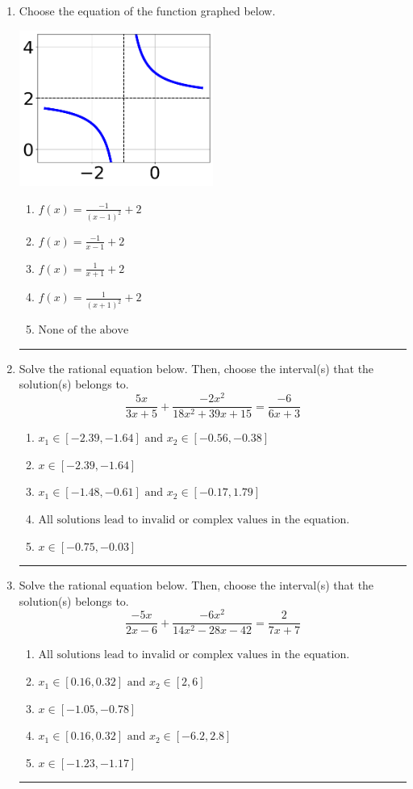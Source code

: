\documentclass[14pt]{extbook}
\newcommand{\litem}[1]{\item#1\hspace*{-1cm}\rule{\textwidth}{0.4pt}}
\begin{document}
\begin{enumerate}
{\begin{enumerate}[label=\Alph*.]
\end{enumerate} }
\litem{
Choose the equation of the function graphed below.
\begin{center}
    \includegraphics[width=0.5\textwidth]{../Figures/rationalGraphToEquationB.png}
\end{center}
\begin{enumerate}[label=\Alph*.]
\item \( f(x) = \frac{-1}{(x - 1)^2} + 2 \)
\item \( f(x) = \frac{-1}{x - 1} + 2 \)
\item \( f(x) = \frac{1}{x + 1} + 2 \)
\item \( f(x) = \frac{1}{(x + 1)^2} + 2 \)
\item \( \text{None of the above} \)

\end{enumerate} }
\litem{
Solve the rational equation below. Then, choose the interval(s) that the solution(s) belongs to.\[ \frac{5x}{3x + 5} + \frac{-2x^{2}}{18x^{2} +39 x + 15} = \frac{-6}{6x + 3} \]\begin{enumerate}[label=\Alph*.]
\item \( x_1 \in [-2.39, -1.64] \text{ and } x_2 \in [-0.56,-0.38] \)
\item \( x \in [-2.39,-1.64] \)
\item \( x_1 \in [-1.48, -0.61] \text{ and } x_2 \in [-0.17,1.79] \)
\item \( \text{All solutions lead to invalid or complex values in the equation.} \)
\item \( x \in [-0.75,-0.03] \)

\end{enumerate} }
\litem{
Solve the rational equation below. Then, choose the interval(s) that the solution(s) belongs to.\[ \frac{-5x}{2x -6} + \frac{-6x^{2}}{14x^{2} -28 x -42} = \frac{2}{7x + 7} \]\begin{enumerate}[label=\Alph*.]
\item \( \text{All solutions lead to invalid or complex values in the equation.} \)
\item \( x_1 \in [0.16, 0.32] \text{ and } x_2 \in [2,6] \)
\item \( x \in [-1.05,-0.78] \)
\item \( x_1 \in [0.16, 0.32] \text{ and } x_2 \in [-6.2,2.8] \)
\item \( x \in [-1.23,-1.17] \)

\end{enumerate} }
\end{enumerate}
\end{document}
